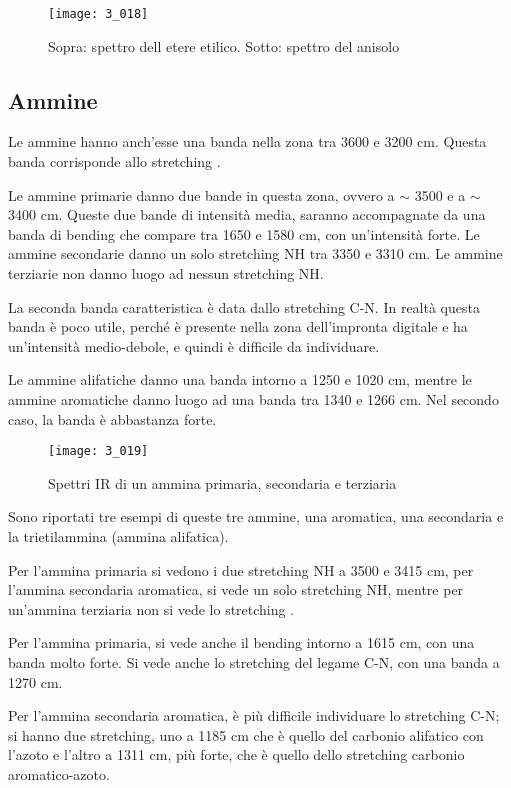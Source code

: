 \begin{figure}[H]
    \texttt{[image: 3\_018]}
    \caption{Sopra: spettro dell etere etilico. Sotto: spettro del anisolo}
    \label{fig:spettroetere}
\end{figure}

\vfill

\subsection{Ammine}

Le ammine hanno anch'esse una banda nella zona tra 3600 e 3200 cm.
Questa banda corrisponde allo stretching .

Le ammine primarie danno due bande in questa zona, ovvero a \(\sim\)
3500 e a \(\sim\) 3400 cm. Queste due bande di intensità media,
saranno accompagnate da una banda di bending che compare tra 1650 e 1580
cm, con un'intensità forte. Le ammine secondarie danno un solo stretching NH tra 3350 e 3310 cm.
Le ammine terziarie non danno luogo ad nessun stretching NH.

La seconda banda caratteristica è data dallo stretching C-N. In realtà
questa banda è poco utile, perché è presente nella zona dell'impronta
digitale e ha un'intensità medio-debole, e quindi è difficile da
individuare.

Le ammine alifatiche danno una banda intorno a 1250 e 1020 cm, mentre
le ammine aromatiche danno luogo ad una banda tra 1340 e 1266 cm. Nel
secondo caso, la banda è abbastanza forte.

\begin{figure}[H]
    \texttt{[image: 3\_019]}
    \caption{Spettri IR di un ammina primaria, secondaria e terziaria}
\end{figure}

Sono riportati tre esempi di queste tre ammine, una aromatica, una
secondaria e la trietilammina (ammina alifatica).

Per l'ammina primaria si vedono i due stretching NH a 3500 e 3415 cm,
per l'ammina secondaria aromatica, si vede un solo stretching NH, mentre
per un'ammina terziaria non si vede lo stretching .

Per l'ammina primaria, si vede anche il bending  intorno a 1615 cm,
con una banda molto forte. Si vede anche lo stretching del legame C-N,
con una banda a 1270 cm.

Per l'ammina secondaria aromatica, è più difficile individuare lo
stretching C-N; si hanno due stretching, uno a 1185 cm che è quello
del carbonio alifatico con l'azoto e l'altro a 1311 cm, più forte, che
è quello dello stretching carbonio aromatico-azoto.

